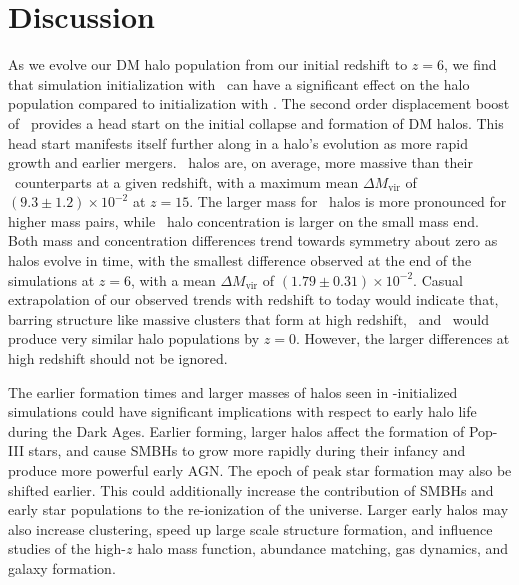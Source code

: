 
%
%

\section{Discussion}
\label{sec:2lpt--discussion}







As we evolve our DM halo population from our initial redshift to $z = 6$, we find that simulation initialization with \lpt\ can have a significant effect on the halo population compared to initialization with \za.  The second order displacement boost of \lpt\ provides a head start on the initial collapse and formation of DM halos.  This head start manifests itself further along in a halo's evolution as more rapid growth and earlier mergers.  \lpt\ halos are, on average, more massive than their \za\ counterparts at a given redshift, with a maximum mean $\Delta M_{\mathrm{vir}}$ of $(9.3 \pm 1.2) \times 10^{-2}$ at $z = 15$.  The larger mass for \lpt\ halos is more pronounced for higher mass pairs, while \lpt\ halo concentration is larger on the small mass end.  Both mass and concentration differences trend towards symmetry about zero as halos evolve in time, with the smallest difference observed at the end of the simulations at $z = 6$, with a mean $\Delta M_{\mathrm{vir}}$ of $(1.79 \pm 0.31) \times 10^{-2}$.  Casual extrapolation of our observed trends with redshift to today would indicate that, barring structure like massive clusters that form at high redshift, \lpt\ and \za\ would produce very similar halo populations by $z = 0$.  However, the larger differences at high redshift should not be ignored.






The earlier formation times and larger masses of halos seen in \lpt-initialized simulations could have significant implications with respect to early halo life during the Dark Ages.  Earlier forming, larger halos affect the formation of Pop-III stars, and cause SMBHs to grow more rapidly during their infancy \citep{2012ApJ...761L...8H} and produce more powerful early AGN.  The epoch of peak star formation may also be shifted earlier.  This could additionally increase the contribution of SMBHs and early star populations to the re-ionization of the universe.  Larger early halos may also increase clustering, speed up large scale structure formation, and influence studies of the high-$z$ halo mass function, abundance matching, gas dynamics, and galaxy formation.

